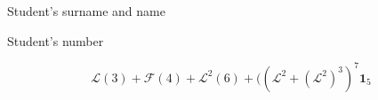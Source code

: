 \documentclass[11pt,reqno]{amsart}
\newcommand{\F}{\mathcal{F}} %
\renewcommand{\L}{\mathcal{L}} %
\newcommand{\LL}{\L^2} %
\newcommand{\LLL}{(\L^2+(\LL)^3} %
\def\indicator{\mathbf{1}}
\begin{document}
\noindent
Student's surname and name \underline{\hspace{68.5ex}}

\vspace{1.5ex}

\noindent
Student's number \underline{\hspace{80ex}}


\vspace{8ex}
$$\L(3) + \F(4) + \LL(6) + (\LLL)^7 \indicator_{5}$$
\noindent
\end{document}
